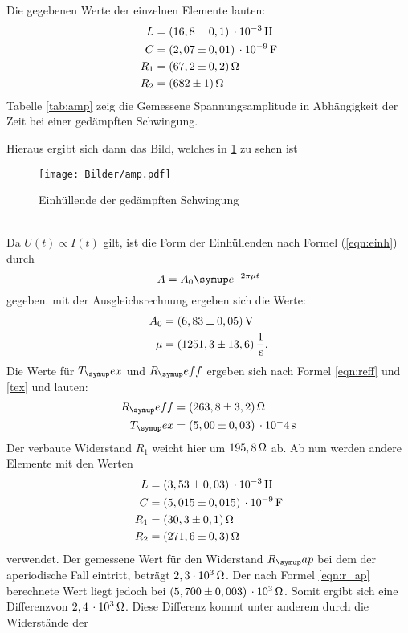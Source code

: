 Die gegebenen Werte der einzelnen Elemente lauten:
\begin{align*}
  L &= (16,8 \pm 0,1) \,\cdot 10^{-3}\Hen \\
  C &= (2,07 \pm 0,01) \,\cdot 10^{-9} \Far \\
  R_1 &= (67,2 \pm 0,2) \Ohm \\
  R_2 &= (682 \pm 1) \Ohm
\end{align*}
Tabelle \ref{tab:amp} zeig die Gemessene Spannungsamplitude in Abhängigkeit der Zeit bei
einer gedämpften Schwingung.

Hieraus ergibt sich dann das Bild, welches in \ref{fig:AMP} zu sehen ist
\begin{figure}[h]
  \centering
  \texttt{[image: Bilder/amp.pdf]}
  \caption{Einhüllende der gedämpften Schwingung}
  \label{fig:AMP}
\end{figure}
\\
Da $U(t)\propto I(t)$ gilt, ist die Form der Einhüllenden nach Formel
(\ref{eqn:einh}) durch
\begin{equation}
  A = A_0\su{e}^{-2\pi\mu t}
\end{equation}
gegeben.
mit der Ausgleichsrechnung ergeben sich die Werte:
\begin{align*}
  A_0 &= (6,83 \pm 0,05)\,\si{\volt}\\
  \mu &= (1251,3 \pm 13,6)\,\frac{1}{\,\si{\second}}.
\end{align*}
Die Werte für $T_\su{ex}$ und $R_\su{eff}$ ergeben sich nach Formel \eqref{eqn:reff}
und \eqref{tex} und lauten:
\begin{align*}
  R_\su{eff} &= (263,8 \pm 3,2)\Ohm \\ %
  T_\su{ex}  &= (5,00 \pm 0,03)\,\cdot 10^-4\sek
\end{align*}
Der verbaute Widerstand $R_1$ weicht hier um $195,8\,\si{\ohm}$ ab.
Ab nun werden andere Elemente mit den Werten
\begin{align*}
  L &= (3,53 \pm 0,03) \,\cdot 10^{-3}\Hen \\
  C &= (5,015 \pm 0,015) \,\cdot 10^{-9} \Far \\
  R_1 &= (30,3 \pm 0,1) \Ohm \\
  R_2 &= (271,6 \pm 0,3) \Ohm
\end{align*}
verwendet.
Der gemessene Wert für den Widerstand $R_\su{ap}$ bei dem der aperiodische Fall
eintritt, beträgt $2,3\cdot 10^3 \,\si{\ohm}$. Der nach Formel \eqref{eqn:r_ap}
berechnete Wert liegt jedoch bei $(5,700 \pm 0,003)\,\cdot 10^3\,\si{\ohm}$. Somit ergibt
sich eine Differenzvon $2,4\,\cdot10^3 \,\si{\ohm}$. Diese Differenz kommt unter anderem durch die Widerstände der
